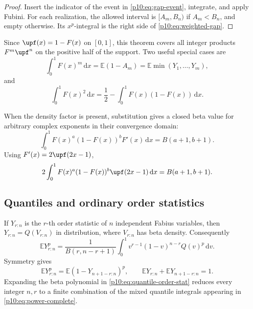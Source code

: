 \documentclass[11pt,oneside]{article}
\theoremstyle{definition}
\theoremstyle{remark}
\newcommand{\F}{F}
\newcommand{\Q}{Q}
\newcommand{\E}{\mathbb E}
\newcommand{\dd}{\,\mathrm d}
\newcommand{\1}{\mathbf 1}
\begin{document}
\begin{proof}
Insert the indicator of the event in \cref{p10:eq:gap-event}, integrate, and apply Fubini.
For each realization, the allowed interval is \([A_m,B_n)\) if \(A_m<B_n\), and empty
otherwise.  Its \(x^p\)-integral is the right side of \cref{p10:eq:weighted-gap}.
\end{proof}

Since \(\upf(x)=1-\F(x)\) on \([0,1]\), this theorem covers all integer products
\(\F^m\upf^n\) on the positive half of the support.  Two useful special cases are
\begin{equation}\label{p10:eq:Fm-order}
 \int_0^1\F(x)^m\dd x=\E(1-A_m)=\E\min(Y_1,\ldots,Y_m),
\end{equation}
and
\begin{equation}\label{p10:eq:F2-gini-relation}
 \int_0^1\F(x)^2\dd x
 =\frac12-\int_0^1\F(x)(1-\F(x))\dd x.
\end{equation}

When the density factor is present, substitution gives a closed beta value for arbitrary
complex exponents in their convergence domain:
\begin{equation}\label{p10:eq:density-beta}
 \int_0^1\F(x)^a(1-\F(x))^b\F'(x)\dd x
 =B(a+1,b+1).
\end{equation}
Using \(\F'(x)=2\upf(2x-1)\),
\begin{equation}\label{p10:eq:up-density-beta}
 2\int_0^1\F(x)^a(1-\F(x))^b\upf(2x-1)\dd x
 =B(a+1,b+1).
\end{equation}

\subsection{Quantiles and ordinary order statistics}

If \(Y_{r:n}\) is the \(r\)-th order statistic of \(n\) independent Fabius variables,
then \(Y_{r:n}=\Q(V_{r:n})\) in distribution, where \(V_{r:n}\) has beta density.
Consequently
\begin{equation}\label{p10:eq:quantile-order-stat}
 \E Y_{r:n}^p
 =\frac1{B(r,n-r+1)}
 \int_0^1v^{r-1}(1-v)^{n-r}\Q(v)^p\dd v.
\end{equation}
Symmetry gives
\begin{equation}\label{p10:eq:order-stat-symmetry}
 \E Y_{r:n}^p
 =\E(1-Y_{n+1-r:n})^p,
 \qquad
 \E Y_{r:n}+\E Y_{n+1-r:n}=1.
\end{equation}
Expanding the beta polynomial in \cref{p10:eq:quantile-order-stat} reduces every integer
\(n,r\) to a finite combination of the mixed quantile integrals appearing in
\cref{p10:eq:power-complete}.
\end{document}
